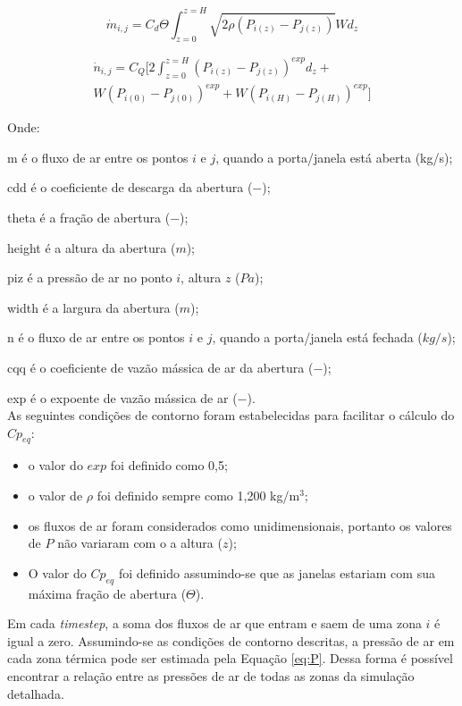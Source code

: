 \documentclass[brazil,hardcopy,openany]{ufscthesis} %
\begin{document}
\begin{equation}
\label{eq:AFEDOP_opened}
\dot{m}_{i,j} = C_d \Theta 	\int_{z=0}^{z=H} \sqrt{2 \rho (P_{i(z)} - P_{j(z)})} W d_z 
\end{equation}

\begin{equation}
\label{eq:AFEDOP_closed}
\begin{split}
\dot{n}_{i,j} = C_Q [2\int_{z=0}^{z=H} {(P_{i(z)} - P_{j(z)})}^{exp} d_z + \\ W{(P_{i(0)} - P_{j(0)})}^{exp} + W{(P_{i(H)} - P_{j(H)})}^{exp}]
\end{split}
\end{equation}

Onde:

\gls{m} é o fluxo de ar entre os pontos $i$ e $j$, quando a porta/janela está aberta (kg/s);

\gls{cdd} é o coeficiente de descarga da abertura ($-$);

\gls{theta} é a fração de abertura ($-$);

\gls{height} é a altura da abertura ($m$);

\gls{piz} é a pressão de ar no ponto $i$, altura $z$ ($Pa$);

\gls{width} é a largura da abertura ($m$);

\gls{n} é o fluxo de ar entre os pontos $i$ e $j$, quando a porta/janela está fechada ($kg/s$);

\gls{cqq} é o coeficiente de vazão mássica de ar da abertura ($-$);

\gls{exp} é o expoente de vazão mássica de ar ($-$).
\\

As seguintes condições de contorno foram estabelecidas para facilitar o cálculo do $Cp_{eq}$:
\begin{itemize}			 
	\item o valor do $exp$ foi definido como 0,5;
	\item o valor de $\rho$ foi definido sempre como 1,200 kg/m$^3$;
	\item os fluxos de ar foram considerados como unidimensionais, portanto os valores de $P$ não variaram com o a altura ($z$);
	\item O valor do $Cp_{eq}$ foi definido assumindo-se que as janelas estariam com sua máxima fração de abertura ($\Theta$).
\end{itemize}

Em cada \textit{timestep}, a soma dos fluxos de ar que entram e saem de uma zona $i$ é igual a zero. Assumindo-se as condições de contorno descritas, a pressão de ar em cada zona térmica pode ser estimada pela Equação \ref{eq:P}. Dessa forma é possível encontrar a relação entre as pressões de ar de todas as zonas da simulação detalhada.
\end{document}
